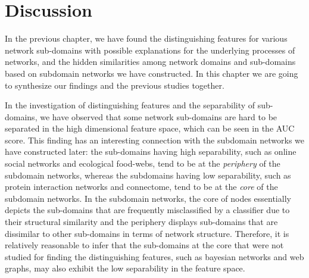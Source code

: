 \section*{Discussion}
In the previous chapter, we have found the distinguishing features for various network sub-domains with possible explanations for the underlying processes of networks, and the hidden similarities among network domains and sub-domains based on subdomain networks we have constructed. In this chapter we are going to synthesize our findings and the previous studies together.

In the investigation of distinguishing features and the separability of sub-domains, we have observed that some network sub-domains are hard to be separated in the high dimensional feature space, which can be seen in the AUC score. This finding has an interesting connection with the subdomain networks we have constructed later: the sub-domains having high separability, such as online social networks and ecological food-webs, tend to be at the \textit{periphery} of the subdomain networks, whereas the subdomains having low separability, such as protein interaction networks and connectome, tend to be at the \textit{core} of the subdomain networks. In the subdomain networks, the core of nodes essentially depicts the sub-domains that are frequently misclassified by a classifier due to their structural similarity and the periphery displays sub-domains that are dissimilar to other sub-domains in terms of network structure. Therefore, it is relatively reasonable to infer that the sub-domains at the core that were not studied for finding the distinguishing features, such as bayesian networks and web graphs, may also exhibit the low separability in the feature space. 


